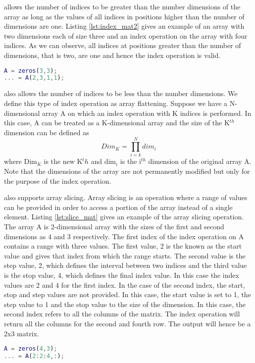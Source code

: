  \matlab allows the number of indices to be greater than the number dimensions of the array as long as the values of all indices in positions higher than the number of dimensions are one. Listing \ref{lst:index_mat2} gives an example of an array with two dimensions each of size three and an index operation on the array with four indices. As we can observe, all indices at positions greater than the number of dimensions, that is two, are one and hence the index operation is valid.
\begin{lstlisting}[language=matlab, label={lst:index_mat2}, caption={An example of an array index operation where the number of indices are greater than the number of dimensions of the array}]
A = zeros(3,3);
... = A(2,3,1,1);
\end{lstlisting}
\matlab also allows  the number of indices to be less than the number dimensions. We define this type of index operation as array flattening. Suppose we have a N-dimensional array A on which an index operation with K indices is performed. In this case, A can be treated as a K-dimensional array and the size of the K$^{th}$ dimension can be defined as 
\begin{equation}
Dim_K  = \prod_{i=k}^{N}{dim_i}
\end{equation}
where Dim$_K$ is the new K$^th$ and dim$_i$ is the i$^{th}$ dimension of the original array A. \\
Note that the dimensions of the array are not permanently modified but only for the purpose of the index operation.

\matlab also supports array slicing. Array slicing is an operation where a range of values can be provided in order to access a portion of the array instead of a single element. Listing \ref{lst:slice_mat} gives an example of the array slicing operation. The array A is 2-dimensional array with the sizes of the first and second dimensions as 4 and 3 respectively. The first index of the index operation on A contains a range with three values. The first value, 2 is the known as the start value and gives that index from which the range starts. The second value is the step value, 2, which defines the interval between two indices and the third value is the stop value, 4, which defines the final index value. In this case the index values are 2 and 4 for the first index. In the case of the second index, the start, stop and step values are not provided. In this case, the start value is set to 1, the step value to 1 and the stop value to the size of the dimension. In this case, the second index refers to all the columns of the matrix. The index operation will return all the columns for the second and fourth row. The output will hence be a 2x3  matrix.
\begin{lstlisting}[language=matlab, label={lst:slice_mat}, caption={An example of an array slicing operation in \matlab}]
A = zeros(4,3);
... = A(2:2:4,:);
\end{lstlisting}
